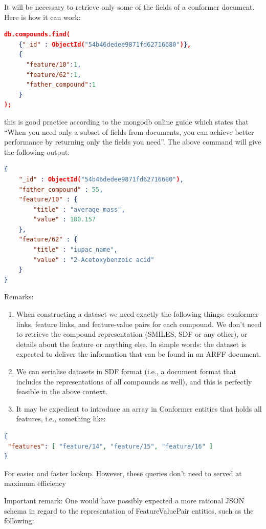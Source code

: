 It will be necessary to retrieve only some of the 
fields of a conformer document. Here is how it can work:

\begin{lstlisting}[language=json]
db.compounds.find(
    {"_id" : ObjectId("54b46dedee9871fd62716680")},
    {
      "feature/10":1, 
      "feature/62":1,
      "father_compound":1
    }
);
\end{lstlisting}

this is good practice according to the mongodb online guide which states that 
``When you need only a subset of fields from documents, you can achieve better 
performance by returning only the fields you need''. 
The above command will give the following output:
\begin{lstlisting}[language=json]
{
	"_id" : ObjectId("54b46dedee9871fd62716680"),
	"father_compound" : 55,
	"feature/10" : {
		"title" : "average_mass",
		"value" : 180.157
	},
	"feature/62" : {
		"title" : "iupac_name",
		"value" : "2-Acetoxybenzoic acid"
	}
}
\end{lstlisting}

\noindent Remarks: 
\begin{enumerate}
 \item  When constructing a dataset we need exactly the following things: conformer links, feature links, and feature-value pairs for each compound. We don’t  need to retrieve the compound representation (SMILES, SDF or any other), or details about the feature or anything else. In simple words: the dataset is expected to deliver the information that can be found in an ARFF document. 
\item  We can serialise datasets in SDF format (i.e., a document format that includes the representations of all compounds as well), and this is perfectly feasible in the above context.
\item  It may be expedient to introduce an array in Conformer entities that holds all features, i.e., something like:
\end{enumerate}
%
\begin{lstlisting}[language=json]
{
 "features": [ "feature/14", "feature/15", "feature/16" ] 
}
\end{lstlisting}
For easier and faster lookup. However, these queries don't need to served at maximum efficiency

Important remark: One would have possibly expected a more rational JSON schema in regard to the representation of FeatureValuePair entities, such as the following:

